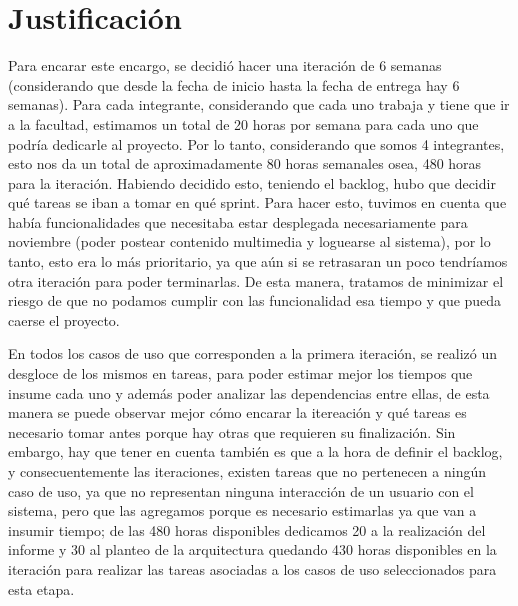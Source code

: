 \section{Justificación}

Para encarar este encargo, se decidió hacer una iteración de 6 semanas  (considerando que desde la fecha de inicio hasta la fecha de entrega hay 6 semanas). Para cada integrante, considerando que cada uno trabaja y tiene que ir a la facultad, estimamos un total de 20 horas por semana para cada uno que podría dedicarle al proyecto. Por lo tanto, considerando que somos 4 integrantes, esto nos da un total de aproximadamente 80 horas semanales osea, 480 horas para la iteración. Habiendo decidido esto, teniendo el backlog, hubo que decidir qué tareas se iban a tomar en qué sprint. Para hacer esto, tuvimos en cuenta que había funcionalidades que necesitaba estar desplegada necesariamente  para noviembre (poder postear contenido multimedia y loguearse al sistema), por lo tanto, esto era lo más prioritario, ya que aún si se retrasaran un poco tendríamos otra iteración para poder terminarlas. De esta manera, tratamos de minimizar el riesgo de que no podamos cumplir con las funcionalidad esa tiempo y que pueda caerse el proyecto.

En todos los casos de uso que corresponden a la primera iteración, se realizó un desgloce de los mismos en tareas, para poder estimar mejor los tiempos que insume cada uno y además poder analizar las dependencias entre ellas, de esta manera se puede observar mejor cómo encarar la itereación y qué tareas es necesario tomar antes porque hay otras que requieren su finalización. Sin embargo, hay que tener en cuenta también es que a la hora de definir el backlog, y consecuentemente las iteraciones, existen tareas que no pertenecen a ningún caso de uso, ya que no representan ninguna interacción de un usuario con el sistema, pero que las agregamos porque es necesario estimarlas ya que van a insumir tiempo; de las 480 horas disponibles dedicamos 20 a la realización del informe y 30 al planteo de la arquitectura quedando 430 horas disponibles en la iteración para realizar las tareas asociadas a los casos de uso seleccionados para esta etapa.

